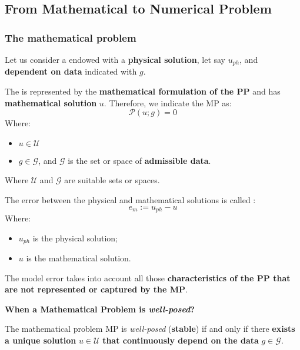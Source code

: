\subsection{From Mathematical to Numerical Problem}

\subsubsection{The mathematical problem}

Let us consider a  endowed with a \textbf{physical solution}, let say $u_{ph}$, and \textbf{dependent on data} indicated with $g$.

\highspace
The  is represented by the \textbf{mathematical formulation of the PP} and has \textbf{mathematical solution} $u$. Therefore, we indicate the MP as:
\begin{equation}\label{eq: mathematical problem}
    \mathcal{P}\left(u; g\right) = 0
\end{equation}
Where:
\begin{itemize}
    \item $u \in \mathcal{U}$
    \item $g \in \mathcal{G}$, and $\mathcal{G}$ is the set or space of \textbf{admissible data}.
\end{itemize}
Where $\mathcal{U}$ and $\mathcal{G}$ are suitable sets or spaces.

\highspace
\begin{definitionbox}
    The error between the physical and mathematical solutions is called :
    \begin{equation}
        e_{m} := u_{ph} - u
    \end{equation}
    Where:
    \begin{itemize}
        \item $u_{ph}$ is the physical solution;
        \item $u$ is the mathematical solution.
    \end{itemize}
\end{definitionbox}

\noindent
The model error takes into account all those \textbf{characteristics of the PP that are not represented or captured by the MP}.

\highspace
\begin{flushleft}
    \textcolor{Green3}{ \textbf{When a Mathematical Problem is \emph{well-posed}?}}
\end{flushleft}
\begin{definitionbox}
    The mathematical problem MP is \emph{well-posed} (\textbf{stable}) if and only if there \textbf{exists a unique solution} $u \in \mathcal{U}$ \textbf{that continuously depend on the data} $g \in \mathcal{G}$.
\end{definitionbox}

